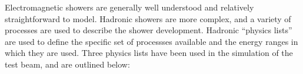 %
%

Electromagnetic showers are generally well understood and relatively straightforward to model. Hadronic showers are more complex, and a variety of processes are used to describe the shower development. Hadronic ``physics lists'' are used to define the specific set of processses available and the energy ranges in which they are used. Three physics lists have been used in the simulation of the test beam, and are outlined below:

